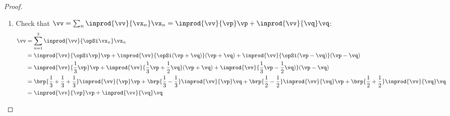 \begin{proof}
\begin{enumerate}
   \item Check that $\vv=\sum_n \inprod{\vv}{\vx_n}\vx_n = \inprod{\vv}{\vp}\vp + \inprod{\vv}{\vq}\vq$:
     \begin{align*}
       \vv
         &= \sum_{n=1}^3 \inprod{\vv}{\opSi\vx_n}\vx_n
       \\&= \inprod{\vv}{\opSi\vp}\vp +\inprod{\vv}{\opSi(\vp+\vq)}(\vp+\vq) +\inprod{\vv}{\opSi(\vp-\vq)}(\vp-\vq)
       \\&= \inprod{\vv}{\frac{1}{3}\vp}\vp 
            +\inprod{\vv}{\frac{1}{3}\vp+\frac{1}{2}\vq}(\vp+\vq) 
            +\inprod{\vv}{\frac{1}{3}\vp-\frac{1}{2}\vq)}(\vp-\vq)
       \\&=   \brp{\frac{1}{3}+\frac{1}{3}+\frac{1}{3}}\inprod{\vv}{\vp}\vp 
            + \brp{\frac{1}{3}-\frac{1}{3}}            \inprod{\vv}{\vp}\vq
            + \brp{\frac{1}{2}-\frac{1}{2}}            \inprod{\vv}{\vq}\vp
            + \brp{\frac{1}{2}+\frac{1}{2}}            \inprod{\vv}{\vq}\vq 
       \\&=   \inprod{\vv}{\vp}\vp + \inprod{\vv}{\vq}\vq 
     \end{align*}

\end{enumerate}
\end{proof}








